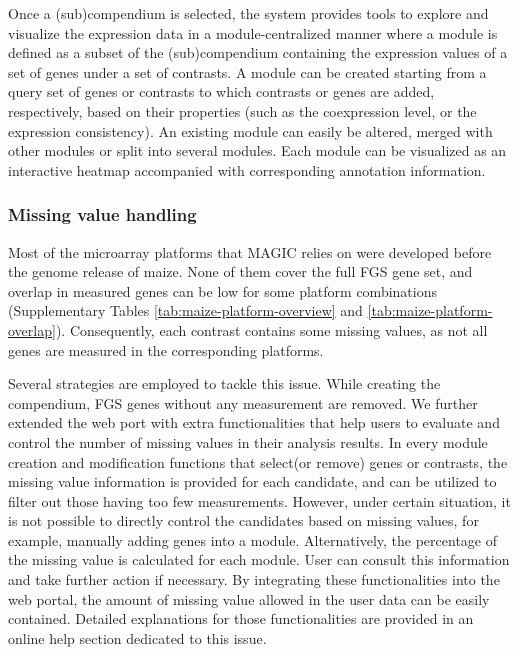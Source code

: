 Once a (sub)compendium is selected, the system provides tools to explore and visualize the expression data in a module-centralized manner where a module is defined as a subset of the (sub)compendium containing the expression values of a set of genes under a set of contrasts. A module can be created starting from a query set of genes or contrasts to which contrasts or genes are added, respectively, based on their properties (such as the coexpression level, or the expression consistency). An existing module can easily be altered, merged with other modules or split into several modules. Each module can be visualized as an interactive heatmap accompanied with corresponding annotation information.


\subsubsection{Missing value handling}

Most of the microarray platforms that MAGIC relies on were developed before the genome release of maize.  None of them cover the full FGS gene set, and overlap in measured genes can be  low for some platform combinations (Supplementary Tables  \ref{tab:maize-platform-overview} and  \ref{tab:maize-platform-overlap}). Consequently, each contrast contains some missing values, as not all genes are measured in the corresponding platforms.  

Several strategies are employed to tackle this issue.  While creating the  compendium, FGS genes without any measurement are removed.   We further extended the web port with extra functionalities that help users to evaluate and control the number of missing values in their analysis results. In every module creation and modification functions that select(or remove) genes or contrasts, the missing value information is provided for each  candidate, and can be utilized to filter out those having too few measurements. However, under certain situation, it is not possible to directly control the candidates based on missing values, for example, manually adding genes into a module. Alternatively, the percentage of the missing value is calculated for each  module. User can consult this information and take further action if necessary. By integrating these functionalities into the web portal, the amount of missing  value allowed in the user data can be easily contained. Detailed explanations for those functionalities are provided in an  online help section dedicated to this issue. 





